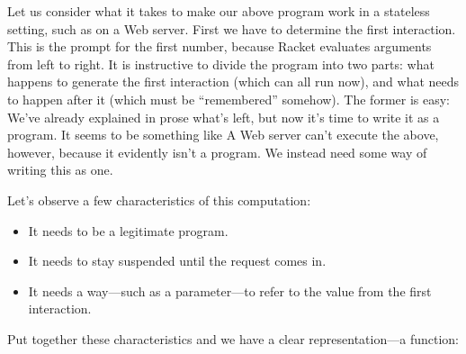 
Let us consider what it takes to make our above program work in a stateless
setting, such as on a Web server. First we have to determine the first
interaction. This is the prompt for the first number, because Racket evaluates
arguments from left to right. It is instructive to divide the program into two
parts: what happens to generate the first interaction (which can all run now),
and what needs to happen after it (which must be “remembered” somehow). The
former is easy:
We’ve already explained in prose what’s left, but now it’s time to write it as a
program. It seems to be something like
A Web server can’t execute the above, however, because it evidently isn’t a
program. We instead need some way of writing this as one.

Let’s observe a few characteristics of this computation:
\begin{itemize}[nosep]
  \item 
It needs to be a legitimate program.
  \item 
It needs to stay suspended until the request comes in.
  \item 
It needs a way—such as a parameter—to refer to the value from the first
interaction.
\end{itemize}

Put together these characteristics and we have a clear representation—a
function:

